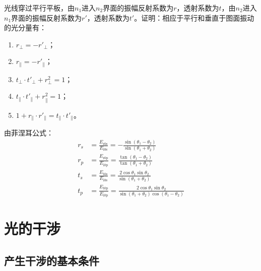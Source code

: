 \documentclass[cn,10pt,chinesefont=founder,math=mtpro2,cite=super,toc=onecol,twoside,openany]{elegantbook}
\begin{document}
\begin{problem}
	光线穿过平行平板，由$n_1$进入$n_2$界面的振幅反射系数为$r$，透射系数为$t$，由$n_2$进入$n_1$界面的振幅反射系数为$r'$，透射系数为$t'$。证明：相应于平行和垂直于图面振动的光分量有：
	\begin{enumerate}
		\item $r_{\perp}=-r'_{\perp}$；
		\item $r_{\parallel}=-r'_{\parallel}$；
		\item $t_{\perp}\cdot t'_{\perp}+r^2_{\perp}=1$；
		\item $t_{\parallel}\cdot t'_{\parallel}+r^2_{\parallel}=1$；
		\item $1+r_{\parallel}\cdot r'_{\parallel}=t_{\parallel}\cdot t'_{\parallel}$。
	\end{enumerate}
\end{problem}
\begin{solution}
由菲涅耳公式：
\begin{equation}
\begin{aligned}
r_s&=\frac{E_{\mathrm{r0s}}}{E_{\mathrm{i0s}}}=-\frac{\sin(\theta_1-\theta_2)}{\sin(\theta_1+\theta_2)}\\ r_p&=\frac{E_{\mathrm{r0p}}}{E_{\mathrm{i0p}}}=\frac{\tan(\theta_1-\theta_2)}{\tan(\theta_1+\theta_2)}\\
t_s&=\frac{E_{\mathrm{t0s}}}{E_{\mathrm{i0s}}}=\frac{2\cos\theta_1\sin\theta_2}{\sin(\theta_1+\theta_2)}\\ t_p&=\frac{E_{\mathrm{t0p}}}{E_{\mathrm{i0p}}}=\frac{2\cos\theta_1\sin\theta_2}{\sin(\theta_1+\theta_2)\cos(\theta_1-\theta_2)}
\end{aligned}
\end{equation}
\end{solution}

\chapter{光的干涉}
\section{产生干涉的基本条件}
\end{document}
